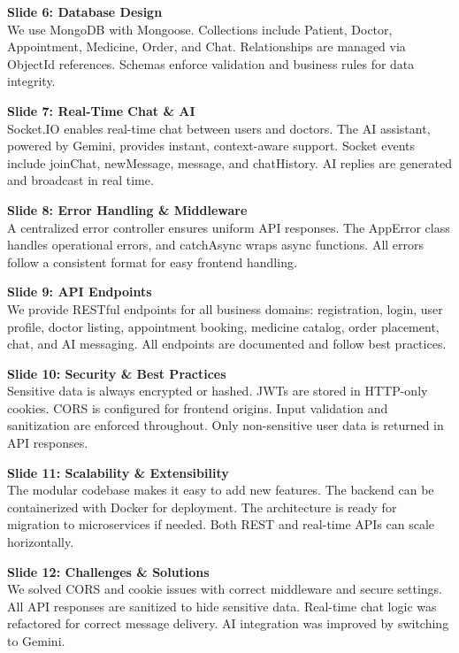 \documentclass[12pt]{article}
\begin{document}
\vspace{0.3cm}
\textbf{Slide 6: Database Design}\\
We use MongoDB with Mongoose. Collections include Patient, Doctor, Appointment, Medicine, Order, and Chat. Relationships are managed via ObjectId references. Schemas enforce validation and business rules for data integrity.

\vspace{0.3cm}
\textbf{Slide 7: Real-Time Chat \& AI}\\
Socket.IO enables real-time chat between users and doctors. The AI assistant, powered by Gemini, provides instant, context-aware support. Socket events include joinChat, newMessage, message, and chatHistory. AI replies are generated and broadcast in real time.

\vspace{0.3cm}
\textbf{Slide 8: Error Handling \& Middleware}\\
A centralized error controller ensures uniform API responses. The AppError class handles operational errors, and catchAsync wraps async functions. All errors follow a consistent format for easy frontend handling.

\vspace{0.3cm}
\textbf{Slide 9: API Endpoints}\\
We provide RESTful endpoints for all business domains: registration, login, user profile, doctor listing, appointment booking, medicine catalog, order placement, chat, and AI messaging. All endpoints are documented and follow best practices.

\vspace{0.3cm}
\textbf{Slide 10: Security \& Best Practices}\\
Sensitive data is always encrypted or hashed. JWTs are stored in HTTP-only cookies. CORS is configured for frontend origins. Input validation and sanitization are enforced throughout. Only non-sensitive user data is returned in API responses.

\vspace{0.3cm}
\textbf{Slide 11: Scalability \& Extensibility}\\
The modular codebase makes it easy to add new features. The backend can be containerized with Docker for deployment. The architecture is ready for migration to microservices if needed. Both REST and real-time APIs can scale horizontally.

\vspace{0.3cm}
\textbf{Slide 12: Challenges \& Solutions}\\
We solved CORS and cookie issues with correct middleware and secure settings. All API responses are sanitized to hide sensitive data. Real-time chat logic was refactored for correct message delivery. AI integration was improved by switching to Gemini.
\end{document}
